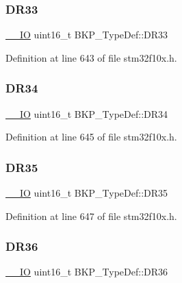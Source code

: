 \subsubsection{\texorpdfstring{D\+R33}{DR33}}
{\footnotesize\ttfamily \hyperlink{core__sc300_8h_aec43007d9998a0a0e01faede4133d6be}{\+\_\+\+\_\+\+IO} uint16\+\_\+t B\+K\+P\+\_\+\+Type\+Def\+::\+D\+R33}



Definition at line 643 of file stm32f10x.\+h.

\mbox{\label{struct_b_k_p___type_def_a0e6152e3a9ac3f0086df42cebb80832f}} 
\subsubsection{\texorpdfstring{D\+R34}{DR34}}
{\footnotesize\ttfamily \hyperlink{core__sc300_8h_aec43007d9998a0a0e01faede4133d6be}{\+\_\+\+\_\+\+IO} uint16\+\_\+t B\+K\+P\+\_\+\+Type\+Def\+::\+D\+R34}



Definition at line 645 of file stm32f10x.\+h.

\mbox{\label{struct_b_k_p___type_def_a085a88cda3752b0f2248f40c3b552905}} 
\subsubsection{\texorpdfstring{D\+R35}{DR35}}
{\footnotesize\ttfamily \hyperlink{core__sc300_8h_aec43007d9998a0a0e01faede4133d6be}{\+\_\+\+\_\+\+IO} uint16\+\_\+t B\+K\+P\+\_\+\+Type\+Def\+::\+D\+R35}



Definition at line 647 of file stm32f10x.\+h.

\mbox{\label{struct_b_k_p___type_def_a239295664cc073b3f3da282fa73dc3c6}} 
\subsubsection{\texorpdfstring{D\+R36}{DR36}}
{\footnotesize\ttfamily \hyperlink{core__sc300_8h_aec43007d9998a0a0e01faede4133d6be}{\+\_\+\+\_\+\+IO} uint16\+\_\+t B\+K\+P\+\_\+\+Type\+Def\+::\+D\+R36}



